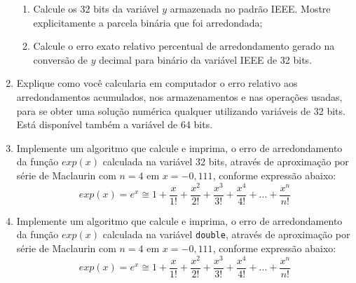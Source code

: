 \documentclass[12pt]{article}
\newenvironment{smallitem}{
    \vspace{-2mm}
    \begin{enumerate}
    \setlength{\parskip}{0pt}
    \setlength{\itemsep}{2pt}
}{
    \vspace{-2mm}
    \end{enumerate}
}
\begin{document}
\begin{enumerate}[label=\textbf{\arabic*})]
\begin{smallitem}

\item Calcule os 32 bits da variável $y$ armazenada no padrão IEEE.
Mostre explicitamente a parcela binária que foi arredondada;
\item Calcule o erro exato relativo percentual de arredondamento gerado
na conversão de $y$ decimal para binário da variável IEEE de 32 bits.

\end{smallitem}

\item Explique como você calcularia em computador o erro relativo aos
arredondamentos acumulados, nos armazenamentos e nas operações usadas, para
se obter uma solução numérica qualquer utilizando variáveis de 32 bits.
Está disponível também a variável de 64 bits.

\item Implemente um algoritmo que calcule e imprima, o erro de
arredondamento da função $exp(x)$ calculada na variável 32 bits, através de
aproximação por série de Maclaurin com $n = 4$ em $x = -0,111$, conforme
expressão abaixo:
\begin{equation*}
exp(x) = e^x \cong 1 + \frac{x}{1!} + \frac{x^2}{2!} + \frac{x^3}{3!} +
\frac{x^4}{4!} + \dots + \frac{x^n}{n!}
\end{equation*}

\item Implemente um algoritmo que calcule e imprima, o erro de
arredondamento da função $exp(x)$ calculada na variável \verb!double!,
através de aproximação por série de Maclaurin com $n = 4$ em $x = -0,111$,
conforme expressão abaixo:
\begin{equation*}
exp(x) = e^x \cong 1 + \frac{x}{1!} + \frac{x^2}{2!} + \frac{x^3}{3!} +
\frac{x^4}{4!} + \dots + \frac{x^n}{n!}
\end{equation*}

\end{enumerate}
\end{document}
